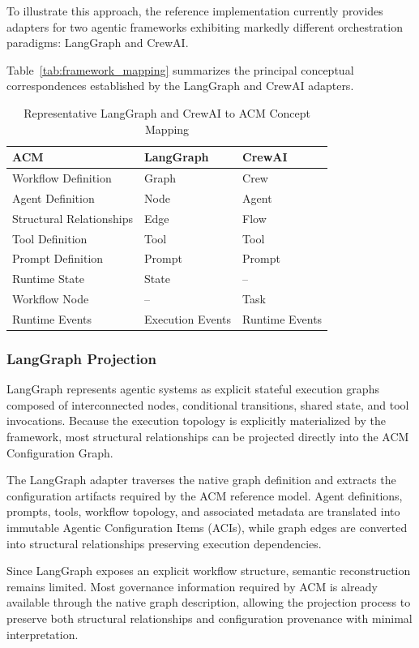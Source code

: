 \documentclass[10pt]{article}
\begin{document}
To illustrate this approach, the reference implementation currently provides adapters for two agentic frameworks exhibiting markedly different orchestration paradigms: LangGraph and CrewAI.

Table~\ref{tab:framework_mapping} summarizes the principal conceptual correspondences established by the LangGraph and CrewAI adapters.

\begin{table}[ht]
\centering
\caption{Representative LangGraph and CrewAI to ACM Concept Mapping}
\label{tab:langgraph_mapping}
\begin{tabular}{lll}
	\toprule
	\textbf{ACM} & \textbf{LangGraph} & \textbf{CrewAI} \\
	\midrule
	Workflow Definition & Graph & Crew \\
	Agent Definition & Node &  Agent \\
	Structural Relationships & Edge &  Flow\\
	Tool Definition & Tool & Tool \\
	Prompt Definition & Prompt & Prompt\\
	Runtime State & State & -- \\
	Workflow Node & -- & Task \\
	Runtime Events & Execution Events & Runtime Events \\
	\bottomrule
\end{tabular}
\end{table}


\subsubsection{LangGraph Projection}

LangGraph represents agentic systems as explicit stateful execution graphs composed of interconnected nodes, conditional transitions, shared state, and tool invocations. Because the execution topology is explicitly materialized by the framework, most structural relationships can be projected directly into the ACM Configuration Graph.

The LangGraph adapter traverses the native graph definition and extracts the configuration artifacts required by the ACM reference model. Agent definitions, prompts, tools, workflow topology, and associated metadata are translated into immutable Agentic Configuration Items (ACIs), while graph edges are converted into structural relationships preserving execution dependencies.

Since LangGraph exposes an explicit workflow structure, semantic reconstruction remains limited. Most governance information required by ACM is already available through the native graph description, allowing the projection process to preserve both structural relationships and configuration provenance with minimal interpretation.
\end{document}
